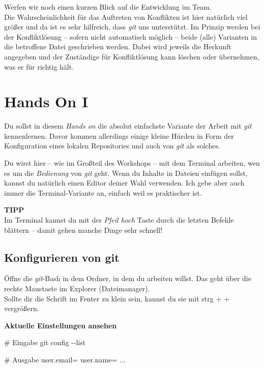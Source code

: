 \documentclass[
  letterpaper,
  DIV=11]{scrreprt}
\newenvironment{Shaded}{\begin{snugshade}}{\end{snugshade}}
\newcommand{\AttributeTok}[1]{\textcolor[rgb]{0.40,0.45,0.13}{#1}}
\newcommand{\CommentTok}[1]{\textcolor[rgb]{0.37,0.37,0.37}{#1}}
\newcommand{\ExtensionTok}[1]{\textcolor[rgb]{0.00,0.23,0.31}{#1}}
\newcommand{\FunctionTok}[1]{\textcolor[rgb]{0.28,0.35,0.67}{#1}}
\newcommand{\NormalTok}[1]{\textcolor[rgb]{0.00,0.23,0.31}{#1}}
\newcommand{\git}{\textit{git}\xspace}
\newcommand{\strg}[1]{strg + #1\xspace}
\begin{document}
Werfen wir noch einen kurzen Blick auf die Entwicklung im Team.\\
Die Wahrscheinlichkeit für das Auftreten von Konflikten ist hier
natürlich viel größer und da ist es sehr hilfreich, dass \git uns
unterstützt. Im Prinzip werden bei der Konfliktlösung -- sofern nicht
automatisch möglich -- beide (alle) Varianten in die betroffene Datei
geschrieben werden. Dabei wird jeweils die Herkunft angegeben und der
Zuständige für Konfliktlösung kann löschen oder übernehmen, was er für
richtig hält.


\chapter{Hands On I}\label{hands-on-i}

Du sollst in diesem \emph{Hands on} die absolut einfachste Variante der
Arbeit mit \git kennenlernen. Davor kommen allerdings einige kleine
Hürden in Form der Konfiguration eines lokalen Repositories und auch von
\git als solches.

Du wirst hier -- wie im Großteil des Workshops -- mit dem Terminal
arbeiten, wen es um die \emph{Bedienung} von \git geht. Wenn du Inhalte
in Dateien einfügen sollst, kannst du natürlich einen Editor deiner Wahl
verwenden. Ich gebe aber auch immer die Terminal-Variante an, einfach
weil es praktischer ist.

\samplestart

\textbf{TIPP}\\
Im Terminal kannst du mit der \emph{Pfeil hoch} Taste durch die letzten
Befehle blättern -- damit gehen manche Dinge sehr schnell! \sampleend

\section{Konfigurieren von git}\label{konfigurieren-von-git}

Öffne die \git-Bash in dem Ordner, in dem du arbeiten willst. Das geht
über die rechte Maustaste im Explorer (Dateimanager).\\
Sollte dir die Schrift im Fenter zu klein sein, kannst du sie mit
\strg{+} vergrößern.

\textbf{Aktuelle Einstellungen ansehen}

\begin{Shaded}
\begin{Highlighting}[]
\CommentTok{\# Eingabe}
\FunctionTok{git}\NormalTok{ config }\AttributeTok{{-}{-}list}

\CommentTok{\# Ausgabe}
\ExtensionTok{user.email=}
\ExtensionTok{user.name=}
     \ExtensionTok{...}
\end{Highlighting}
\end{Shaded}
\end{document}

